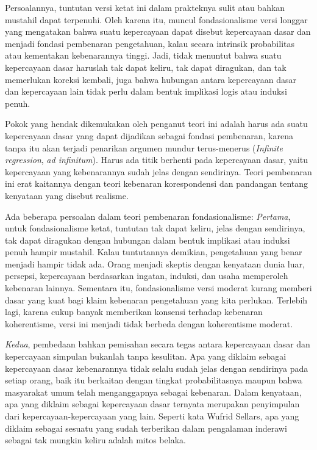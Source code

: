 \documentclass[11pt,twoside,a5paper,openany]{memoir}
\begin{document}
Persoalannya, tuntutan versi ketat ini dalam prakteknya sulit atau
bahkan mustahil dapat terpenuhi. Oleh karena itu, muncul fondasionalisme
versi longgar yang mengatakan bahwa suatu kepercayaan dapat disebut
kepercayaan dasar dan menjadi fondasi pembenaran pengetahuan, kalau
secara intrinsik probabilitas atau kementakan kebenarannya tinggi. Jadi,
tidak menuntut bahwa suatu kepercayaan dasar haruslah tak dapat keliru,
tak dapat diragukan, dan tak memerlukan koreksi kembali, juga bahwa
hubungan antara kepercayaan dasar dan kepercayaan lain tidak perlu dalam
bentuk implikasi logis atau induksi penuh.

Pokok yang hendak dikemukakan oleh penganut teori ini adalah harus ada
suatu kepercayaan dasar yang dapat dijadikan sebagai fondasi pembenaran,
karena tanpa itu akan terjadi penarikan argumen mundur terus-menerus
(\emph{Infinite regression}, \emph{ad infinitum}). Harus ada titik
berhenti pada kepercayaan dasar, yaitu kepercayaan yang kebenarannya
sudah jelas dengan sendirinya. Teori pembenaran ini erat kaitannya
dengan teori kebenaran korespondensi dan pandangan tentang kenyataan
yang disebut realisme.

Ada beberapa persoalan dalam teori pembenaran fondasionalisme:
\emph{Pertama}, untuk fondasionalisme ketat, tuntutan tak dapat keliru,
jelas dengan sendirinya, tak dapat diragukan dengan hubungan dalam
bentuk implikasi atau induksi penuh hampir mustahil. Kalau tuntutannya
demikian, pengetahuan yang benar menjadi hampir tidak ada. Orang menjadi
skeptis dengan kenyataan dunia luar, persepsi, kepercayaan berdasarkan
ingatan, induksi, dan usaha memperoleh kebenaran lainnya. Sementara itu,
fondasionalisme versi moderat kurang memberi dasar yang kuat bagi klaim
kebenaran pengetahuan yang kita perlukan. Terlebih lagi, karena cukup
banyak memberikan konsensi terhadap kebenaran koherentisme, versi ini
menjadi tidak berbeda dengan koherentisme moderat.

\emph{Kedua}, pembedaan bahkan pemisahan secara tegas antara kepercayaan
dasar dan kepercayaan simpulan bukanlah tanpa kesulitan. Apa yang
diklaim sebagai kepercayaan dasar kebenarannya tidak selalu sudah jelas
dengan sendirinya pada setiap orang, baik itu berkaitan dengan tingkat
probabilitasnya maupun bahwa masyarakat umum telah menganggapnya sebagai
kebenaran. Dalam kenyataan, apa yang diklaim sebagai kepercayaan dasar
ternyata merupakan penyimpulan dari kepercayaan-kepercayaan yang lain.
Seperti kata Wufrid Sellars, apa yang diklaim sebagai sesuatu yang sudah
terberikan dalam pengalaman inderawi sebagai tak mungkin keliru adalah
mitos belaka.
\end{document}
